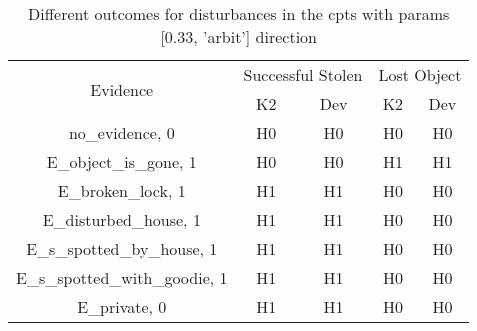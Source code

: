 \begin{table}\begin{tabular}{c|cc|cc}\toprule\multirow{2}{*}{Evidence} & \multicolumn{2}{c}{Successful Stolen} & \multicolumn{2}{c}{Lost Object} \\& {K2} & {Dev} & {K2} & {Dev} \\\midrule
no\_evidence, 0 & H0&H0&H0&H0\\E\_object\_is\_gone, 1 & H0&H0&H1&H1\\E\_broken\_lock, 1 & H1&H1&H0&H0\\E\_disturbed\_house, 1 & H1&H1&H0&H0\\E\_s\_spotted\_by\_house, 1 & H1&H1&H0&H0\\E\_s\_spotted\_with\_goodie, 1 & H1&H1&H0&H0\\E\_private, 0 & H1&H1&H0&H0\\\bottomrule\end{tabular}\caption{Different outcomes for disturbances in the cpts with params [0.33, 'arbit'] direction}\end{table}